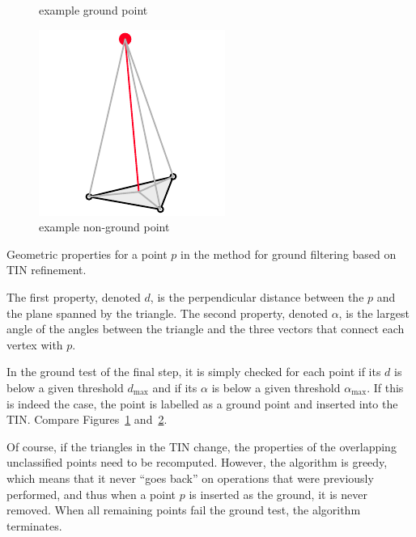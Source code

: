 \begin{marginfigure}
\begin{subfigure}[b]{0.6\linewidth}
    \caption{example ground point}\label{fig:ground-filtering:ground}
  \end{subfigure}
  \begin{subfigure}[b]{0.6\linewidth}
    \centering
    \includegraphics[width=\textwidth]{groundfilter-nonground.pdf}
    \caption{example non-ground point}\label{fig:ground-filtering:nonground}
  \end{subfigure}
  \caption{Geometric properties for a point $p$ in the method for ground filtering based on TIN refinement.}%
\label{fig:ground-filtering}
\end{marginfigure}
The first property, denoted $d$, is the perpendicular distance between the $p$ and the plane spanned by the triangle.
The second property, denoted $\alpha$, is the largest angle of the angles between the triangle and the three vectors that connect each vertex with $p$. 

In the ground test of the final step, it is simply checked for each point if its $d$ is below a given threshold $d_{\max}$ and if its $\alpha$ is below a given threshold $\alpha_{\max}$.
If this is indeed the case, the point is labelled as a ground point and inserted into the TIN\@.
Compare Figures~\ref{fig:ground-filtering:ground} and~\ref{fig:ground-filtering:nonground}.

Of course, if the triangles in the TIN change, the properties of the overlapping unclassified points need to be recomputed. 
However, the algorithm is greedy, which means that it never ``goes back'' on operations that were previously performed, and thus when a point $p$ is inserted as the ground, it is never removed.
When all remaining points fail the ground test, the algorithm terminates.

